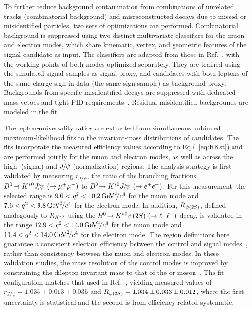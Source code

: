 To further reduce background contamination from combinations of unrelated tracks (combinatorial background) and misreconstructed decays due to missed or
misidentified particles, two sets of optimizations are performed. Combinatorial background is suppressed using two distinct multivariate classifiers for the
muon and electron modes, which share kinematic, vertex, and geometric features of the signal candidate as input. The classifiers are adapted from those in
Ref.~\cite{LHCb-PAPER-2022-045}, with the working points of both modes optimized separately. They are trained using the simulated signal samples as signal proxy, and candidates with both leptons of the same charge sign in data (the same-sign sample) as background proxy. Backgrounds from specific misidentified decays are suppressed with dedicated mass vetoes and tight PID requirements~\cite{LHCb-PAPER-2022-045}. Residual misidentified backgrounds are modeled in the fit.

The lepton-universality ratios are extracted from simultaneous unbinned maximum-likelihood fits to the \Bz invariant-mass distributions of \decay{\Bz}{\Kstarz\ell^+\ell^-} candidates. The
fits incorporate the measured efficiency values according to Eq.(~\ref{eq:RKst}) and are performed jointly for the muon and electron modes, as well as across the high-\qsq
(signal) and ${{J\mskip -3mu/\mskip -2mu\psi}}$ (normalization) regions. The analysis strategy is first validated by measuring $r_{J/\psi}$, the ratio of the branching fractions $\decay{B^0}{\Kstarz \jpsi~(\to \mu^+\mu^-)}$ to $\decay{B^0}{\Kstarz \jpsi~(\to e^+e^-)}$. For this measurement, the selected range is $9.0<{q^2}< 10.2\text{\,Ge\kern -0.1em V}^2\!/c^4$ for the muon mode and $7.6<{q^2}< 9.8\text{\,Ge\kern -0.1em V}^2\!/c^4$ for the electron mode. In addition, $R_{{\psi{(2S)}}}$, defined analogously to $R_{{{K}^{*0}}}$ using the $\decay{B^0}{\Kstarz \psitwos~(\to \ell^+\ell^-)}$ decay, is validated in the range $12.9< {q^2}< 14.0\text{\,Ge\kern -0.1em V}^2\!/c^4$ for the muon mode and $11.4<{q^2}< 14.0\text{\,Ge\kern -0.1em V}^2\!/c^4$ for the electron mode.
The \qsq region definitions here guarantee a consistent selection efficiency between the
control and signal modes~\cite{LHCb-PAPER-2024-056}, rather than consistency between the muon and electron modes.
In these validation studies, the \Bz mass resolution of the control modes is improved by constraining the dilepton invariant mass to that of the \jpsi or \psitwos
meson~\cite{PDG2024}. The fit configuration matches that used in Ref.~\cite{LHCb-PAPER-2022-045}, yielding measured values of $r_{J/\psi} = 1.035 \pm
0.013\pm0.035$ and $R_{{\psi{(2S)}}} = 1.034 \pm 0.033 \pm 0.012$, where the first uncertainty is statistical and the second is from efficiency-related systematic.

